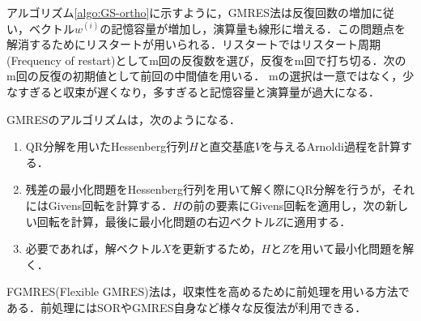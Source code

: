 アルゴリズム\ref{algo:GS-ortho}に示すように，GMRES法は反復回数の増加に従い，ベクトル$w^{(i)}$の記憶容量が増加し，演算量も線形に増える．この問題点を解消するためにリスタートが用いられる．リスタートではリスタート周期(Frequency of restart)としてm回の反復数を選び，反復をm回で打ち切る．次のm回の反復の初期値として前回の中間値を用いる．
mの選択は一意ではなく，少なすぎると収束が遅くなり，多すぎると記憶容量と演算量が過大になる．

\vspace{3mm}
GMRESのアルゴリズムは，次のようになる．
\begin{enumerate}
\item QR分解を用いたHessenberg行列$H$と直交基底$V$を与えるArnoldi過程を計算する．
\item 残差の最小化問題をHessenberg行列を用いて解く際にQR分解を行うが，それにはGivens回転を計算する．$H$の前の要素にGivens回転を適用し，次の新しい回転を計算，最後に最小化問題の右辺ベクトル$Z$に適用する．
\item 必要であれば，解ベクトル$X$を更新するため，$H$と$Z$を用いて最小化問題を解く．
\end{enumerate}



FGMRES(Flexible GMRES)法は，収束性を高めるために前処理を用いる方法である．前処理にはSORやGMRES自身など様々な反復法が利用できる．




